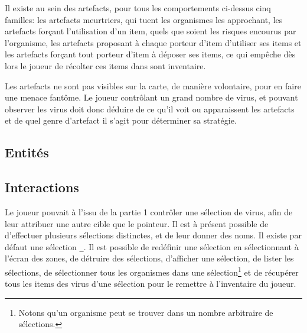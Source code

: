 \documentclass[a4paper,french]{article}
\begin{document}
Il existe au sein des artefacts, pour tous les comportements ci-dessus cinq
familles: les artefacts meurtriers, qui tuent les organismes les approchant,
les artefacts forçant l'utilisation d'un item, quels que soient les risques
encourus par l'organisme, les artefacts proposant à chaque porteur d'item
d'utiliser ses items et les artefacts forçant tout porteur d'item à déposer ses
items, ce qui empêche dès lors le joueur de récolter ces items dans sont
inventaire.
\medskip

Les artefacts ne sont pas visibles sur la carte, de manière volontaire, pour en
faire une menace fantôme. Le joueur contrôlant un grand nombre de virus, et
pouvant observer les virus doit donc déduire de ce qu'il voit ou apparaissent
les artefacts et de quel genre d'artefact il s'agit pour déterminer sa
stratégie.



\subsection{Entit\'es}

\subsection{Interactions}
Le joueur pouvait à l'issu de la partie 1 contrôler une sélection de virus, afin
de leur attribuer une autre cible que le pointeur. Il est à présent possible de
d'effectuer plusieurs sélections distinctes, et de leur donner des noms. Il
existe par défaut une sélection \texttt\_. Il est possible de redéfinir une
sélection en sélectionnant à l'écran des zones, de détruire des sélections,
d'afficher une sélection, de lister les sélections, de sélectionner tous les
organismes dans une sélection\footnote{Notons qu'un organisme peut se trouver
dans un nombre arbitraire de sélections.} et de récupérer tous les items des
virus d'une sélection pour le remettre à l'inventaire du joueur.\\
\end{document}
